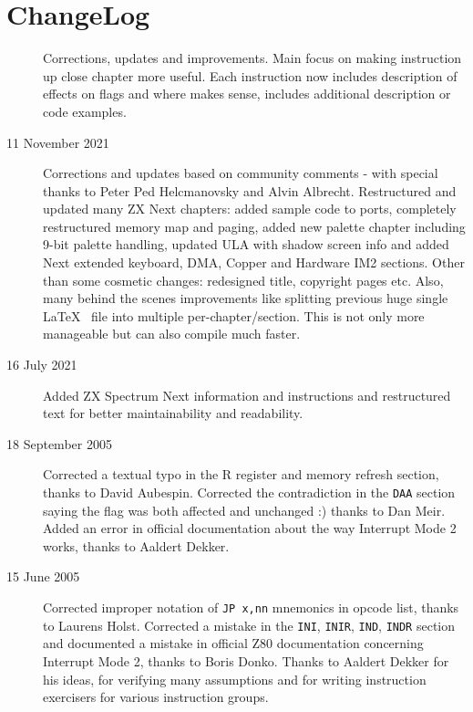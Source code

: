 \pagebreak
\section{ChangeLog}

\begin{description}


	\item[\LatestRevisionName]
	Corrections, updates and improvements. Main focus on making instruction up close chapter more useful. Each instruction now includes description of effects on flags and where makes sense, includes additional description or code examples.

	\item[11 November 2021]
	Corrections and updates based on community comments - with special thanks to Peter Ped Helcmanovsky and Alvin Albrecht. Restructured and updated many ZX Next chapters: added sample code to ports, completely restructured memory map and paging, added new palette chapter including 9-bit palette handling, updated ULA with shadow screen info and added Next extended keyboard, DMA, Copper and Hardware IM2 sections. Other than some cosmetic changes: redesigned title, copyright pages etc. Also, many behind the scenes improvements like splitting previous huge single \LaTeX~ file into multiple per-chapter/section. This is not only more manageable but can also compile much faster.

	\item[16 July 2021]
	Added ZX Spectrum Next information and instructions and restructured text for better maintainability and readability.

	\item[18 September 2005]
	Corrected a textual typo in the R register and memory refresh section, thanks to David Aubespin. Corrected the contradiction in the {\tt DAA} section saying the \FlagNF{} flag was both affected and unchanged :) thanks to Dan Meir. Added an error in official documentation about the way Interrupt Mode 2 works, thanks to Aaldert Dekker.
	
	\item[15 June 2005]
	Corrected improper notation of {\tt JP x,nn} mnemonics in opcode list, thanks to Laurens Holst. Corrected a mistake in the {\tt INI}, {\tt INIR}, {\tt IND}, {\tt INDR} section and documented a mistake in official Z80 documentation concerning Interrupt Mode 2, thanks to Boris Donko. Thanks to Aaldert Dekker for his ideas, for verifying many assumptions and for writing instruction exercisers for various instruction groups.


\end{description}

